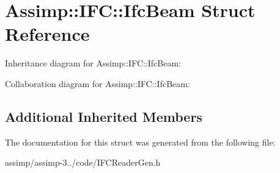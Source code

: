 \hypertarget{struct_assimp_1_1_i_f_c_1_1_ifc_beam}{\section{Assimp\+:\+:I\+F\+C\+:\+:Ifc\+Beam Struct Reference}
\label{struct_assimp_1_1_i_f_c_1_1_ifc_beam}
}


Inheritance diagram for Assimp\+:\+:I\+F\+C\+:\+:Ifc\+Beam\+:


Collaboration diagram for Assimp\+:\+:I\+F\+C\+:\+:Ifc\+Beam\+:
\subsection*{Additional Inherited Members}


The documentation for this struct was generated from the following file\+:\begin{DoxyCompactItemize}
\item 
assimp/assimp-\/3../code/I\+F\+C\+Reader\+Gen.\+h\end{DoxyCompactItemize}
